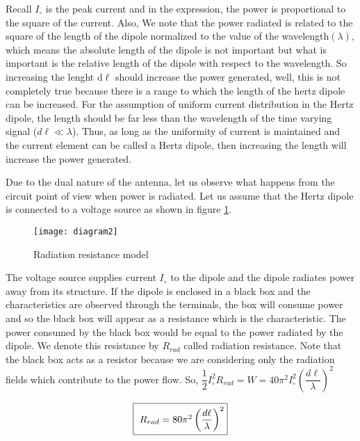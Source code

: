  Recall $I_\circ$ is the peak current and in the expression, the power is proportional to the square of the current. Also, We note that the power radiated is related to the square of the length of the dipole normalized to the value of the wavelength$(\lambda)$, which means the absolute length of the dipole is not important but what is important is the relative length of the dipole with respect to the wavelength. So increasing the lenght d$\ell$ should increase the power generated, well, this is not completely true because there is a range to which the length of the hertz dipole can be increased. For the assumption of uniform current distribution in the Hertz dipole, the length should be far less than the wavelength of the time varying signal ($d\ell \ll \lambda$). Thus, as long as the uniformity of current is maintained and the current element can be called a Hertz dipole, then increasing the length will increase the power generated. 
 
 Due to the dual nature of the antenna, let us observe what happens from the circuit point of view when power is radiated. Let us assume that the Hertz dipole is connected to a voltage source as shown in figure \ref{figure13}.
\begin{figure}[h]
	\centering
	\vspace{-10pt}
	\texttt{[image: diagram2]}
	\caption{Radiation resistance model}
	\label{figure13}
\end{figure}


 The voltage source supplies current $I_\circ$ to the dipole and the dipole radiates power away from its structure. If the dipole is enclosed in a black box and the characteristics are observed through the terminals, the box will consume power and so the black box will appear as a resistance which is the characteristic. The power consumed by the black box would be equal to the power radiated by the dipole. We denote this resistance by $R_{rad}$ called radiation resistance. Note that the black box acts as a resistor because we are considering only the radiation fields which contribute to the power flow. So, 
 $\dfrac{1}{2}I_\circ^2R_{rad} = W = 40\pi^2I_\circ^2\left(\dfrac{d\ell}{\lambda}\right)^2$
 
 \begin{align}
 	\fbox{ $ R_{rad} = 80\pi^2\left(\dfrac{d\ell}{\lambda}\right)^2$}
 \end{align}

